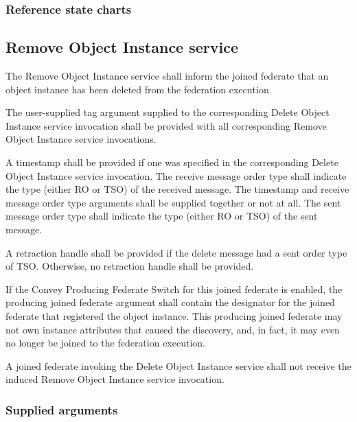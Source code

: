 \begin{compactstdpage}

    \subsubsection{Reference state charts}



    \subsection{Remove Object Instance \rtiinitiated{} service}


    The Remove Object Instance \rtiinitiated{} service shall inform the joined federate that an object instance has been deleted from the federation execution.


    The user-supplied tag argument supplied to the corresponding Delete Object Instance service invocation shall be provided with all corresponding Remove Object Instance \rtiinitiated{} service invocations.


    A timestamp shall be provided if one was specified in the corresponding Delete Object Instance service invocation. The receive message order type shall indicate the type (either RO or TSO) of the received message. The timestamp and receive message order type arguments shall be supplied together or not at all. The sent message order type shall indicate the type (either RO or TSO) of the sent message.


    A retraction handle shall be provided if the delete message had a sent order type of TSO. Otherwise, no retraction handle shall be provided.


    If the Convey Producing Federate Switch for this joined federate is enabled, the producing joined federate argument shall contain the designator for the joined federate that registered the object instance. This producing joined federate may not own instance attributes that caused the discovery, and, in fact, it may even no longer be joined to the federation execution.


    A joined federate invoking the Delete Object Instance service shall not receive the induced Remove Object Instance \rtiinitiated{} service invocation.

    \subsubsection{Supplied arguments}



\end{compactstdpage}
